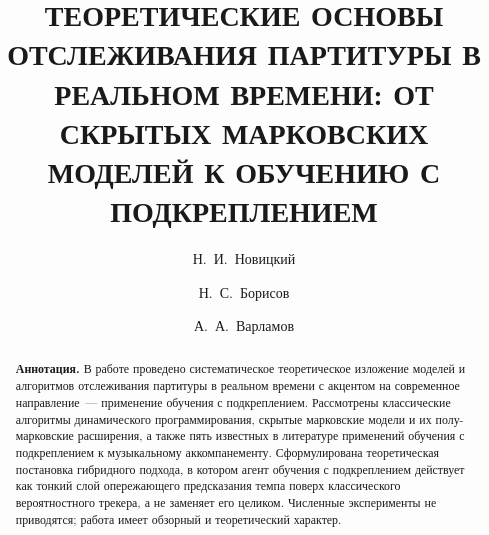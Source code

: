 \documentclass[%
  aps,pre,
  superscriptaddress,
  longbibliography,nofootinbib,
  showkeys,
  amsmath,amssymb,floatfix
]{revtex4-2}
\providecommand{\firstname}[1]{#1}
\providecommand{\surname}[1]{#1}
\begin{document}


\title{\MakeUppercase{Теоретические основы отслеживания партитуры в
       реальном времени: от скрытых марковских моделей к обучению с
       подкреплением}}

\author{\firstname{Н.~И.}~\surname{Новицкий}}

\author{\firstname{Н.~С.}~\surname{Борисов}}

\author{\firstname{А.~А.}~\surname{Варламов}}



\begin{abstract}
\textbf{Аннотация.}\space
В работе проведено систематическое теоретическое изложение моделей
и алгоритмов отслеживания партитуры в реальном времени с акцентом
на современное направление~--- применение обучения с подкреплением.
Рассмотрены классические алгоритмы динамического программирования,
скрытые марковские модели и их полу-марковские расширения, а также
пять известных в литературе применений обучения с подкреплением к
музыкальному аккомпанементу. Сформулирована теоретическая
постановка гибридного подхода, в котором агент обучения с
подкреплением действует как тонкий слой опережающего предсказания
темпа поверх классического вероятностного трекера, а не заменяет
его целиком. Численные эксперименты не приводятся; работа имеет
обзорный и теоретический характер.
\end{abstract}

\maketitle
\thispagestyle{withbanner}
\end{document}
